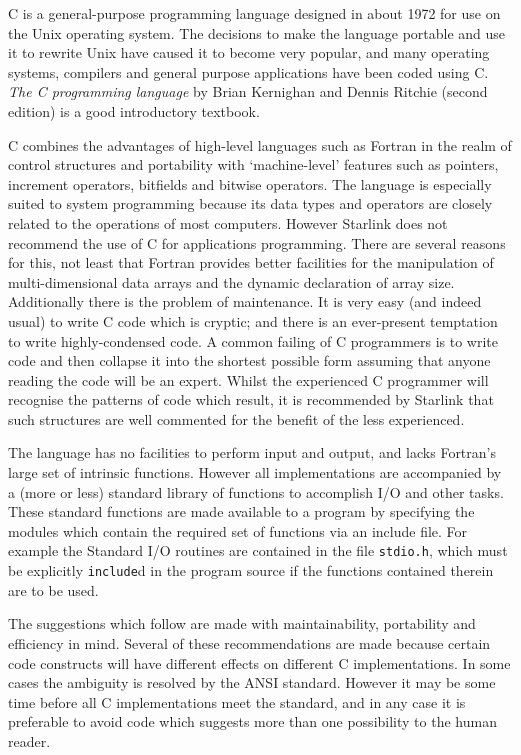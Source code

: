 C is a general-purpose programming language designed in about 1972 for use on the Unix 
operating system.
The decisions to make the language portable and use it to rewrite Unix have
caused it to become very popular, and many operating systems, compilers and 
general purpose applications have been coded using C.
{\sl The C programming language} by Brian Kernighan and Dennis Ritchie (second 
edition) is a good introductory textbook.

C combines the advantages of high-level languages such as Fortran in the
realm of control structures and portability with `machine-level' features
such as pointers, increment operators, bitfields and bitwise
operators. The language  is especially suited to system programming because
its data types and operators are closely related to the operations of most
computers. However Starlink does not recommend the use of C for
applications programming. There are several reasons for this, not least
that Fortran provides better facilities for the manipulation of
multi-dimensional data arrays and the dynamic declaration of array size. 
Additionally there is the problem of maintenance.
It is very easy (and indeed usual) to write C code which is cryptic; and there 
is an ever-present temptation to write highly-condensed code.
A common failing of C programmers is to write code and then collapse it
into the shortest possible form assuming that anyone reading the code will be 
an expert.
Whilst the experienced C programmer will recognise the patterns of code 
which result, it is recommended by Starlink  
that such structures are well commented for the benefit of the less
experienced.

The language has no facilities to perform input and output, and lacks 
Fortran's large set of intrinsic functions.
However all implementations are accompanied by a (more or less) standard 
library of functions to accomplish I/O and other tasks.
These standard functions are made available to  a program by specifying
the modules  which contain the required set of functions via an include file.
For example the Standard I/O routines are contained in the file {\tt stdio.h},
which must be explicitly {\tt include}d in the program source if the functions 
contained therein are to be used.

The suggestions which follow are made with maintainability, portability and 
efficiency in mind.
Several of these recommendations are made because certain code constructs 
will have different effects on different C  implementations.
In some cases the ambiguity is resolved by the ANSI  standard.
However it may be some time before all C implementations meet the standard,
and in any case it is preferable to avoid code which suggests more than one
possibility to the human reader.

